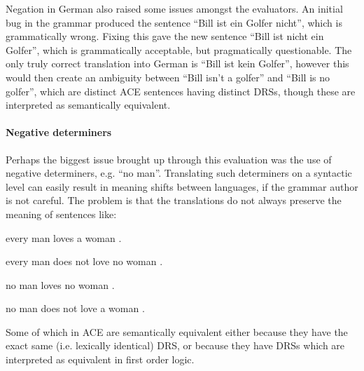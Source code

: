 \documentclass[a4paper]{article}
\begin{document}
Negation in German also raised some issues amongst the evaluators.  An
initial bug in the grammar produced the sentence ``Bill ist ein Golfer
nicht'', which is grammatically wrong.  Fixing this gave the new
sentence ``Bill ist nicht ein Golfer'', which is grammatically
acceptable, but pragmatically questionable.  The only truly correct
translation into German is ``Bill ist kein Golfer'', however this
would then create an ambiguity between ``Bill isn't a golfer'' and
``Bill is no golfer'',
which are distinct ACE sentences having distinct DRSs,
though these are interpreted as semantically equivalent.


\paragraph{Negative determiners}

Perhaps the biggest issue brought up through this evaluation was the
use of negative determiners, e.g. ``no man''.  Translating such
determiners on a syntactic level can easily result in meaning shifts
between languages, if the grammar author is not careful. The problem
is that the translations do not always preserve the meaning of
sentences like:
\begin{itemize*}
  \item every man loves a woman .
  \item every man does not love no woman .
  \item no man loves no woman .
  \item no man does not love a woman .
\end{itemize*}
Some of which in ACE are semantically equivalent either because they
have the exact same (i.e. lexically identical) DRS, or because they
have DRSs which are interpreted as equivalent in first order logic.

\end{document}

